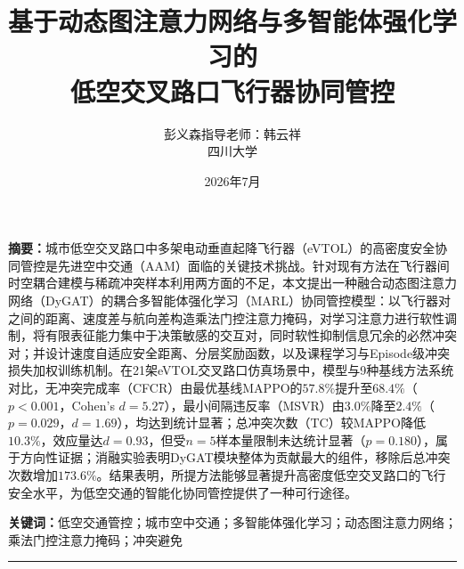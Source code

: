 \documentclass[12pt,a4paper,UTF8]{ctexart}
\begin{document}
\title{\textbf{基于动态图注意力网络与多智能体强化学习的\\低空交叉路口飞行器协同管控}}
\author{彭义森\quad 指导老师：韩云祥\\[4pt]\small 四川大学}
\date{2026年7月}

\maketitle

\vspace{6pt}
\noindent\textbf{摘\quad 要：}城市低空交叉路口中多架电动垂直起降飞行器（eVTOL）的高密度安全协同管控是先进空中交通（AAM）面临的关键技术挑战。针对现有方法在飞行器间时空耦合建模与稀疏冲突样本利用两方面的不足，本文提出一种融合动态图注意力网络（DyGAT）的耦合多智能体强化学习（MARL）协同管控模型：以飞行器对之间的距离、速度差与航向差构造乘法门控注意力掩码，对学习注意力进行软性调制，将有限表征能力集中于决策敏感的交互对，同时软性抑制信息冗余的必然冲突对；并设计速度自适应安全距离、分层奖励函数，以及课程学习与Episode级冲突损失加权训练机制。在21架eVTOL交叉路口仿真场景中，模型与9种基线方法系统对比，无冲突完成率（CFCR）由最优基线MAPPO的$57.8\%$提升至$68.4\%$（$p<0.001$，Cohen's $d=5.27$），最小间隔违反率（MSVR）由$3.0\%$降至$2.4\%$（$p=0.029$，$d=1.69$），均达到统计显著；总冲突次数（TC）较MAPPO降低$10.3\%$，效应量达$d=0.93$，但受$n=5$样本量限制未达统计显著（$p=0.180$），属于方向性证据；消融实验表明DyGAT模块整体为贡献最大的组件，移除后总冲突次数增加$173.6\%$。结果表明，所提方法能够显著提升高密度低空交叉路口的飞行安全水平，为低空交通的智能化协同管控提供了一种可行途径。

\vspace{6pt}
\noindent\textbf{关键词：}低空交通管控；城市空中交通；多智能体强化学习；动态图注意力网络；乘法门控注意力掩码；冲突避免

\vspace{8pt}
\hrule
\vspace{10pt}
\end{document}

